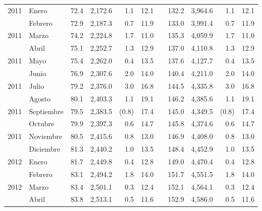 \begin{center}
\begin{longtable}{llrrrrrrrrr}
		\multicolumn{1}{l}{	2011	}&	Enero	&	 72.4 	&	 2,172.6 	&	 1.1 	&	 12.1 	&  &	 132.2 	&	 3,964.6 	&	 1.1 	&	 12.1 	\\
		\rowcolor{color1!5!white}\multicolumn{1}{l}{	2011	}&	Febrero	&	 72.9 	&	 2,187.3 	&	 0.7 	&	 11.9 	&  &	 133.0 	&	 3,991.4 	&	 0.7 	&	 11.9 	\\
		\multicolumn{1}{l}{	2011	}&	Marzo	&	 74.2 	&	 2,224.8 	&	 1.7 	&	 11.0 	&  &	 135.3 	&	 4,059.9 	&	 1.7 	&	 11.0 	\\
		\rowcolor{color1!5!white}\multicolumn{1}{l}{	2011	}&	Abril	&	 75.1 	&	 2,252.7 	&	 1.3 	&	 12.9 	&  &	 137.0 	&	 4,110.8 	&	 1.3 	&	 12.9 	\\
		\multicolumn{1}{l}{	2011	}&	Mayo	&	 75.4 	&	 2,262.0 	&	 0.4 	&	 13.5 	&  &	 137.6 	&	 4,127.7 	&	 0.4 	&	 13.5 	\\
		\rowcolor{color1!5!white}\multicolumn{1}{l}{	2011	}&	Junio	&	 76.9 	&	 2,307.6 	&	 2.0 	&	 14.0 	&  &	 140.4 	&	 4,211.0 	&	 2.0 	&	 14.0 	\\
		\multicolumn{1}{l}{	2011	}&	Julio	&	 79.2 	&	 2,376.0 	&	 3.0 	&	 16.8 	&  &	 144.5 	&	 4,335.8 	&	 3.0 	&	 16.8 	\\
		\rowcolor{color1!5!white}\multicolumn{1}{l}{	2011	}&	Agosto	&	 80.1 	&	 2,403.3 	&	 1.1 	&	 19.1 	&  &	 146.2 	&	 4,385.6 	&	 1.1 	&	 19.1 	\\
		\multicolumn{1}{l}{	2011	}&	Septiembre	&	 79.5 	&	 2,383.5 	&	 (0.8)	&	 17.4 	&  &	 145.0 	&	 4,349.5 	&	 (0.8)	&	 17.4 	\\
		\rowcolor{color1!5!white}\multicolumn{1}{l}{	2011	}&	Octubre	&	 79.9 	&	 2,397.3 	&	 0.6 	&	 14.7 	&  &	 145.8 	&	 4,374.6 	&	 0.6 	&	 14.7 	\\
		\multicolumn{1}{l}{	2011	}&	Noviembre	&	 80.5 	&	 2,415.6 	&	 0.8 	&	 13.0 	&  &	 146.9 	&	 4,408.0 	&	 0.8 	&	 13.0 	\\
		\rowcolor{color1!5!white}\multicolumn{1}{l}{	2011	}&	Diciembre	&	 81.3 	&	 2,440.2 	&	 1.0 	&	 13.5 	&  &	 148.4 	&	 4,452.9 	&	 1.0 	&	 13.5 	\\
		\multicolumn{1}{l}{	2012	}&	Enero	&	 81.7 	&	 2,449.8 	&	 0.4 	&	 12.8 	&  &	 149.0 	&	 4,470.4 	&	 0.4 	&	 12.8 	\\
		\rowcolor{color1!5!white}\multicolumn{1}{l}{	2012	}&	Febrero	&	 83.1 	&	 2,494.2 	&	 1.8 	&	 14.0 	&  &	 151.7 	&	 4,551.5 	&	 1.8 	&	 14.0 	\\
		\multicolumn{1}{l}{	2012	}&	Marzo	&	 83.4 	&	 2,501.1 	&	 0.3 	&	 12.4 	&  &	 152.1 	&	 4,564.1 	&	 0.3 	&	 12.4 	\\
		\rowcolor{color1!5!white}\multicolumn{1}{l}{	2012	}&	Abril	&	 83.8 	&	 2,513.1 	&	 0.5 	&	 11.6 	&  &	 152.9 	&	 4,586.0 	&	 0.5 	&	 11.6 	\\

\end{longtable}
\end{center}
